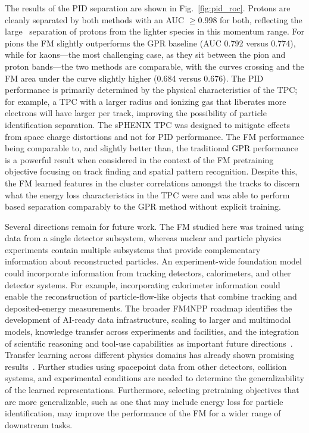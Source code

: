 \documentclass[aps,physrev,twocolumn,superscriptaddress]{revtex4-2}
\begin{document}
The results of the PID separation are shown in Fig.~\ref{fig:pid_roc}. Protons are cleanly separated by both methods with an AUC $\geq 0.998$ for both, reflecting the large \dedx\ separation of protons from the lighter species in this momentum range. For pions the FM slightly outperforms the GPR baseline (AUC 0.792 versus 0.774), while for kaons---the most challenging case, as they sit between the pion and proton bands---the two methods are comparable, with the curves crossing and the FM area under the curve slightly higher (0.684 versus 0.676). The PID performance is primarily determined by the physical characteristics of the TPC; for example, a TPC with a larger radius and ionizing gas that liberates more electrons will have larger \dedx per track, improving the possibility of particle identification separation. The sPHENIX TPC was designed to mitigate effects from space charge distortions and not for PID performance. The FM performance being comparable to, and slightly better than, the traditional GPR performance is a powerful result when considered in the context of the FM pretraining objective focusing on track finding and spatial pattern recognition. Despite this, the FM learned features in the cluster correlations amongst the tracks to discern what the energy loss characteristics in the TPC were and was able to perform \dedx based separation comparably to the GPR method without explicit training. 



Several directions remain for future work. The FM studied here was trained using data from a single detector subsystem, whereas nuclear and particle physics experiments contain multiple subsystems that provide complementary information about reconstructed particles. An experiment-wide foundation model could incorporate information from tracking detectors, calorimeters, and other detector systems. For example, incorporating calorimeter information could enable the reconstruction of particle-flow-like objects that combine tracking and deposited-energy measurements. The broader FM4NPP roadmap identifies the development of AI-ready data infrastructure, scaling to larger and multimodal models, knowledge transfer across experiments and facilities, and the integration of scientific reasoning and tool-use capabilities as important future directions~\cite{Ren:2026fm4npproadmap}. Transfer learning across different physics domains has already shown promising results~\cite{Krzmanc:2026fdw}. Further studies using spacepoint data from other detectors, collision systems, and experimental conditions are needed to determine the generalizability of the learned representations. Furthermore, selecting pretraining objectives that are more generalizable, such as one that may include energy loss for particle identification, may improve the performance of the FM for a wider range of downstream tasks.
\end{document}
